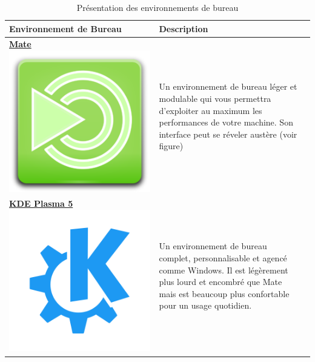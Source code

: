 \begin{table}[ht]
	\centering
	\begin{tabularx}{\textwidth}{|C|X|X|}
		\hline
		\textbf{Environnement de Bureau} & \textbf{Description} \\
		\hline
		\href{https://mate-desktop.org/fr/}{\textbf{Mate} \linebreak \vspace{5px} \centering \includegraphics[height=0.5\linewidth]{images/mate}} & Un environnement de bureau léger et modulable qui vous permettra d'exploiter au maximum les performances de votre machine. Son interface peut se réveler austère (voir figure) \\
		\hline
		\href{https://kde.org/fr/}{\textbf{KDE Plasma 5} \linebreak \vspace{5px} \centering \includegraphics[width=0.5\linewidth]{images/kdelogo}} & Un environnement de bureau complet, personnalisable et agencé comme Windows. Il est légèrement plus lourd et encombré que Mate mais est beaucoup plus confortable pour un usage quotidien. \\
		\hline
	\end{tabularx}
	\caption{Présentation des environnements de bureau}
	\label{tab:desktop}
\end{table}

